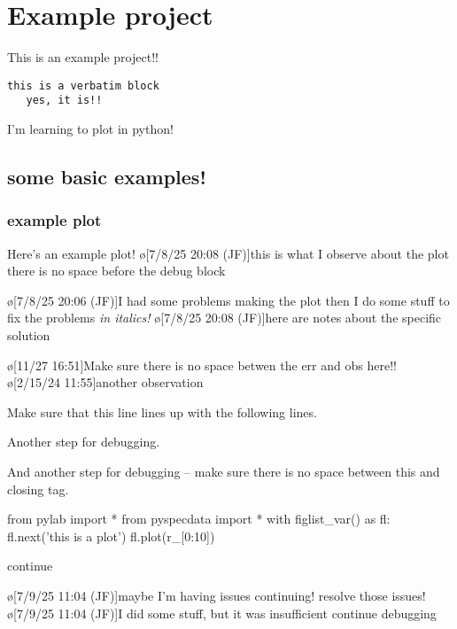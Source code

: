 \section{Example project}
This is an example project!!
\begin{verbatim}
this is a verbatim block
   yes, it is!!
\end{verbatim}
I'm learning to plot in python!

\subsection{some basic examples!}
\subsubsection{example plot}\label{sec:examplePlot1}
Here's an example plot!
\o[7/8/25 20:08 (JF)]{this is what I observe about the plot there is no space before the debug block}
\begin{err}
    \o[7/8/25 20:06 (JF)]{I had some problems making the plot}
    then I do some stuff to fix the problems
    \textit{in italics!}
    \o[7/8/25 20:08 (JF)]{here are notes about the specific solution}
\end{err}
\o[11/27 16:51]{Make sure there is no space betwen the err and obs here!!}
\o[2/15/24 11:55]{another observation}

\begin{err}
    Make sure that this line lines up with the following lines.

    Another step for debugging.

    And another step for debugging -- make sure there is no space between this and closing tag.
\end{err}
\par
\begin{python}[on]
from pylab import *
from pyspecdata import *
with figlist_var() as fl:
    fl.next('this is a plot')
    fl.plot(r_[0:10])
\end{python}
\par
continue

\begin{err}
    \o[7/9/25 11:04 (JF)]{maybe I'm having issues continuing!}
    resolve those issues!
    \o[7/9/25 11:04 (JF)]{I did some stuff, but it was insufficient}
    continue debugging

\end{err}
